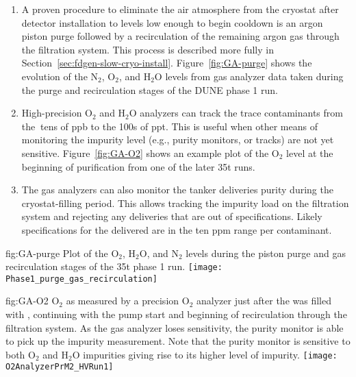 \begin{enumerate}
\item A proven procedure to eliminate the air atmosphere from the cryostat after detector installation to levels low enough to begin cooldown is an argon piston purge followed by a recirculation of the remaining argon gas through the filtration system. This process is described more fully in Section~\ref{sec:fdgen-slow-cryo-install}. Figure~\ref{fig:GA-purge} shows the evolution of the $\text{N}_2$, $\text{O}_2$, and $\text{H}_2\text{O}$ levels from gas analyzer data taken during the purge and recirculation stages of the DUNE  %
phase 1 run.

\item High-precision $\text{O}_2$ and $\text{H}_2\text{O}$ analyzers can track the trace contaminants from the $\>$tens of ppb to the \num{100}s of ppt. This is useful when other means of monitoring the impurity level (e.g., purity monitors, or  tracks) are not yet sensitive. Figure~\ref{fig:GA-O2} shows an example plot of the $\text{O}_2$ level at the beginning of  purification from one of the later \num{35}\si{t} %
 runs.

\item The gas analyzers can also monitor the tanker  deliveries purity during the cryostat-filling period. This allows tracking the impurity load on the filtration system and rejecting any deliveries that are out of specifications. Likely specifications for the delivered  are in the ten \si{ppm} range per contaminant.

\end{enumerate}

\begin{dunefigure}{fig:GA-purge}
  {Plot of the $\text{O}_2$, $\text{H}_2\text{O}$, and $\text{N}_2$ levels during the piston purge and gas recirculation stages of the \num{35}\si{t} %
  phase 1 run.}
  \texttt{[image: Phase1\_purge\_gas\_recirculation]}%
\end{dunefigure}

\begin{dunefigure}{fig:GA-O2}
  {$\text{O}_2$ as measured by a precision $\text{O}_2$ analyzer just after the  %
  was filled with , continuing with the  pump start and beginning of  recirculation through the filtration system. As the gas analyzer loses sensitivity, the purity monitor is able to pick up the impurity measurement. Note that the purity monitor is sensitive to both $\text{O}_2$ and $\text{H}_2\text{O}$ impurities giving rise to its higher level of impurity.}
  \texttt{[image: O2AnalyzerPrM2\_HVRun1]}%
\end{dunefigure}

